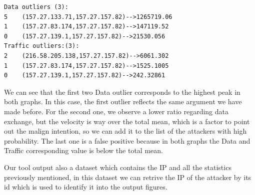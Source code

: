 \begin{lstlisting}[columns=flexible, breaklines=true, frame=tb, caption={\textit{DDoSMixed.csv-report} file}, label={lst:DoSMixed.csv-report}]
Data outliers (3):
5    (157.27.133.71,157.27.157.82)-->1265719.06
1    (157.27.83.174,157.27.157.82)-->147119.52
0    (157.27.139.1,157.27.157.82)-->21530.056
Traffic outliers:(3):
2    (216.58.205.138,157.27.157.82)-->6061.302
1    (157.27.83.174,157.27.157.82)-->1525.1005
0    (157.27.139.1,157.27.157.82)-->242.32861
\end{lstlisting}

We can see that the first two Data outlier corresponds to the highest peak in both graphs. In this case, the first outlier reflects the same argument we have made before. For the second one, we observe a lower ratio regarding data exchange, but the velocity is way over the total mean, which is a factor to point out the malign intention, so we can add it to the list of the attackers with high probability. The last one is a false positive because in both graphs the Data and Traffic corresponding value is below the total mean.



Our tool output also a dataset which contains the IP and all the statistics previously mentioned, in this dataset we can retrive the IP of the attacker by its id which is used to identify it into the output figures. 
